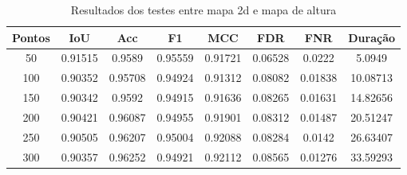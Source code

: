 \begin{table}[h]
            \centering
            \caption{Resultados dos testes entre mapa 2d e mapa de altura}
            \label{tab:final_output_2d_output_3d}
            \begin{tabular}{|c|c|c|c|c|c|c|c|}
                \hline
                                Pontos & IoU & Acc & F1 & MCC & FDR & FNR & Duração \\
                \hline
                50 & 0.91515 & 0.9589 & 0.95559 & 0.91721 & 0.06528 & 0.0222 & 5.0949\\
        100 & 0.90352 & 0.95708 & 0.94924 & 0.91312 & 0.08082 & 0.01838 & 10.08713\\
        150 & 0.90342 & 0.9592 & 0.94915 & 0.91636 & 0.08265 & 0.01631 & 14.82656\\
        200 & 0.90421 & 0.96087 & 0.94955 & 0.91901 & 0.08312 & 0.01487 & 20.51247\\
        250 & 0.90505 & 0.96207 & 0.95004 & 0.92088 & 0.08284 & 0.0142 & 26.63407\\
        300 & 0.90357 & 0.96252 & 0.94921 & 0.92112 & 0.08565 & 0.01276 & 33.59293\\
                \hline
            \end{tabular}
        \end{table}


